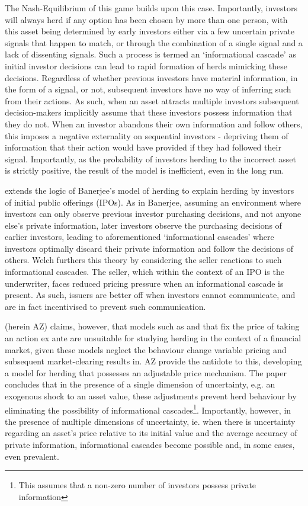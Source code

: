 \documentclass[12pt]{article}
\numberwithin{table}{section}   %
\begin{document}
The Nash-Equilibrium of this game builds upon this case. Importantly, investors will always herd if any option has been chosen by more than one person, with this asset being determined by early investors either via a few uncertain private signals that happen to match, or through the combination of a single signal and a lack of dissenting signals. Such a process is termed an ‘informational cascade’ as initial investor decisions can lead to rapid formation of herds mimicking these decisions. Regardless of whether previous investors have material information, in the form of a signal, or not, subsequent investors have no way of inferring such from their actions. As such, when an asset attracts multiple investors subsequent decision-makers implicitly assume that these investors possess information that they do not. When an investor abandons their own information and follow others, this imposes a negative externality on sequential investors - depriving them of information that their action would have provided if they had followed their signal. Importantly, as the probability of investors herding to the incorrect asset is strictly positive, the result of the model is inefficient, even in the long run.

\citet{welch} extends the logic of Banerjee’s model of herding to explain herding by investors of initial public offerings (IPOs). As in Banerjee, assuming an environment where investors can only observe previous investor purchasing decisions, and not anyone else’s private information, later investors observe the purchasing decisions of earlier investors, leading to aforementioned ‘informational cascades’ where investors optimally discard their private information and follow the decisions of others. Welch furthers this theory by considering the seller reactions to such informational cascades. The seller, which within the context of an IPO is the underwriter, faces reduced pricing pressure when an informational cascade is present. As such, issuers are better off when investors cannot communicate, and are in fact incentivised to prevent such communication.

\citet{avery} (herein AZ) claims, however, that models such as \citet{banerjee} and \citet{welch} that fix the price of taking an action ex ante are unsuitable for studying herding in the context of a financial market, given these models neglect the behaviour change variable pricing and subsequent market-clearing results in. AZ provide the antidote to this, developing a model for herding that possesses an adjustable price mechanism. The paper concludes that in the presence of a single dimension of uncertainty, e.g.  an exogenous shock to an asset value, these adjustments prevent herd behaviour by eliminating the possibility of informational cascades\footnote{This assumes that a non-zero number of investors possess private information}. Importantly, however, in the presence of multiple dimensions of uncertainty, ie. when there is uncertainty regarding an asset's price relative to its initial value and the average accuracy of private information,  informational cascades become possible and, in some cases, even prevalent.
\end{document}
